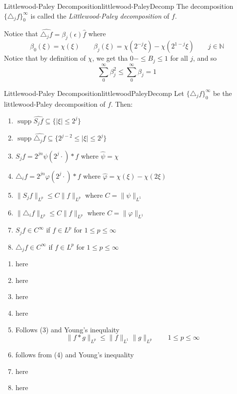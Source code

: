 \documentclass{book}
\newenvironment{Proof}[1][]
  {\begin{ProofTcb}[#1]}
  {\end{ProofTcb}}
\newcommand{\N}{{\mathbb{N}}}
\newcommand{\sse}{\subseteq}
\renewcommand{\phi}{\varphi}
\newcommand{\supp}{\operatorname{supp}}
\begin{document}
\begin{defn}{Littlewood-Paley Decomposition}{littlewood-PaleyDecomp}
	The decomposition $\{\triangle_j f\}_0^\infty$ is called the \emph{Littlewood-Paley decomposition}
	of $f$.
\end{defn}

Notice that $\widehat{\triangle_j f} = \beta_j(\epsilon)\hat{f}$ where
\begin{equation}\label{eq:FourierTransOnDiff}
  \beta_0(\xi) = \chi(\xi) \qquad \beta_j(\xi) = \chi(2^{-j}\xi) -\chi(2^{1-j}\xi) \qquad j \in \N
\end{equation}
Notice that by definition of $\chi$, we get tha $0- \le B_j \le 1$ for all $j$, and so
\[
	\sum_0^\infty \beta_j^2 \le \sum_0^\infty \beta_j = 1
\]

\begin{prop}{Littlewood-Paley Decomposition}{littlewoodPaleyDecomp}
	Let $\{\triangle_j f\}_0^\infty$ be the littlewood-Paley decomposition of $f$. Then:
	\begin{enumerate}
		\item $\supp \widehat{S_j f} \sse \{|\xi| \le 2^j\}$
		\item $\supp \widehat{\triangle_j f} \sse \{2^{j-2} \le |\xi| \le 2^j\}$
		\item $S_jf = 2^{jn}\psi(2^j\cdot)*f$ where $\hat{\psi} = \chi$
		\item $\triangle_i f = 2^{jn}\phi(2^j\cdot)*f$ where $\hat{\phi} = \chi(\xi) - \chi(2\xi)$
		\item  $\|S_j f\|_{L^p} \le C\|f\|_{L^p}$ where $C = \|\psi\|_{L^1}$
		\item $\|\triangle_i f\|_{L^p} \le C\|f\|_{L^p}$ where $C = \|\phi\|_{L^1}$
		\item $S_j f\in C^\infty$ if $f \in L^p$ for $1 \le p \le \infty$
		\item $\triangle_j f\in C^\infty$ if $f \in L^p$ for $1 \le p \le \infty$
	\end{enumerate}
\end{prop}

\begin{Proof}
	\begin{enumerate}
		\item here
		\item here
		\item here
		\item here
		\item Follows (3) and Young's inequlaity
			\[
				\|f*g\|_{L^p} \le \|f\|_{L^1}\|g\|_{L^p} \qquad 1 \le p \le \infty
			\]
		\item follows from (4) and Young's inequality
		\item here
		\item here
	\end{enumerate}
\end{Proof}
\end{document}
